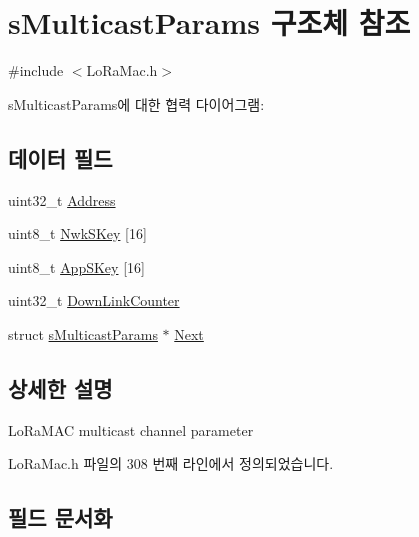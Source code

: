 \hypertarget{structs_multicast_params}{}\section{s\+Multicast\+Params 구조체 참조}
\label{structs_multicast_params}


{\ttfamily \#include $<$Lo\+Ra\+Mac.\+h$>$}



s\+Multicast\+Params에 대한 협력 다이어그램\+:
\subsection*{데이터 필드}
\begin{DoxyCompactItemize}
\item 
uint32\+\_\+t \mbox{\hyperlink{structs_multicast_params_aca1b23fd721c8d8dc70a8227e336b6e8}{Address}}
\item 
uint8\+\_\+t \mbox{\hyperlink{structs_multicast_params_adb8f473333a3f15032a04a78260f8ead}{Nwk\+S\+Key}} \mbox{[}16\mbox{]}
\item 
uint8\+\_\+t \mbox{\hyperlink{structs_multicast_params_a44d7cdeb3d44f4e7f8a0cefc938aaa5c}{App\+S\+Key}} \mbox{[}16\mbox{]}
\item 
uint32\+\_\+t \mbox{\hyperlink{structs_multicast_params_a7a566925baf83b1b3da9209dfa4bb79a}{Down\+Link\+Counter}}
\item 
struct \mbox{\hyperlink{structs_multicast_params}{s\+Multicast\+Params}} $\ast$ \mbox{\hyperlink{structs_multicast_params_ac9765374ff15c55462baa90d1331b3b4}{Next}}
\end{DoxyCompactItemize}


\subsection{상세한 설명}
Lo\+Ra\+M\+AC multicast channel parameter 

Lo\+Ra\+Mac.\+h 파일의 308 번째 라인에서 정의되었습니다.



\subsection{필드 문서화}
\mbox{\label{structs_multicast_params_aca1b23fd721c8d8dc70a8227e336b6e8}} 
